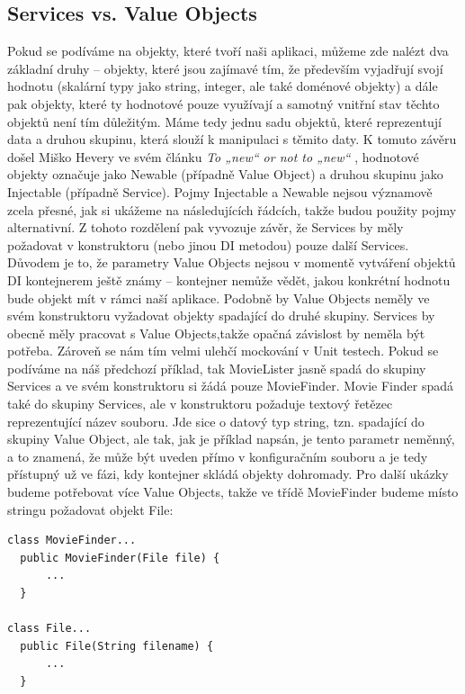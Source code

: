 \documentclass[a4paper,conference]{IEEEtran}
\begin{document}
\subsection{Services vs. Value Objects}

Pokud se podíváme na objekty, které tvoří naši aplikaci, můžeme zde nalézt dva základní druhy – objekty, které jsou zajímavé tím, že především vyjadřují svojí hodnotu (skalární typy jako string, integer, ale také doménové objekty) a dále pak objekty, které ty hodnotové pouze využívají a samotný vnitřní stav těchto objektů není tím důležitým. Máme tedy jednu sadu objektů, které reprezentují data a druhou skupinu, která slouží k manipulaci s těmito daty. K tomuto závěru došel Miško Hevery ve svém článku \emph{To „new“ or not to „new“} \cite{How to Think About the new Operator with Respect to Unit Testing}, hodnotové objekty označuje jako Newable (případně Value Object) a druhou skupinu jako Injectable (případně Service). Pojmy Injectable a Newable nejsou významově zcela přesné, jak si ukážeme na následujících řádcích, takže budou použity pojmy alternativní. Z tohoto rozdělení pak vyvozuje závěr, že Services by měly požadovat v konstruktoru (nebo jinou DI metodou) pouze další Services. Důvodem je to, že parametry Value Objects nejsou v momentě vytváření objektů DI kontejnerem ještě známy – kontejner nemůže vědět, jakou konkrétní hodnotu bude objekt mít v rámci naší aplikace. Podobně by Value Objects neměly ve svém konstruktoru vyžadovat objekty spadající do druhé skupiny. Services by obecně měly pracovat s Value Objects,takže opačná závislost by neměla být potřeba. Zároveň se nám tím velmi ulehčí mockování v Unit testech.
Pokud se podíváme na náš předchozí příklad, tak MovieLister jasně spadá do skupiny Services a ve svém konstruktoru si žádá pouze MovieFinder. Movie Finder spadá také do skupiny Services, ale v konstruktoru požaduje textový řetězec reprezentující název souboru. Jde sice o datový typ string, tzn. spadající do skupiny Value Object, ale tak, jak je příklad napsán, je tento parametr neměnný, a to znamená, že může být uveden přímo v konfiguračním souboru a je tedy přístupný už ve fázi, kdy kontejner skládá objekty dohromady.
Pro další ukázky budeme potřebovat více Value Objects, takže ve třídě MovieFinder budeme místo stringu požadovat objekt File:

\lstset{language=Java, caption=Value Object jako parametr v konstruktoru, label=listing:Java}
\begin{lstlisting}
class MovieFinder...
  public MovieFinder(File file) {
      ...
  }

class File...
  public File(String filename) {
      ...
  }
\end{lstlisting}
\end{document}
